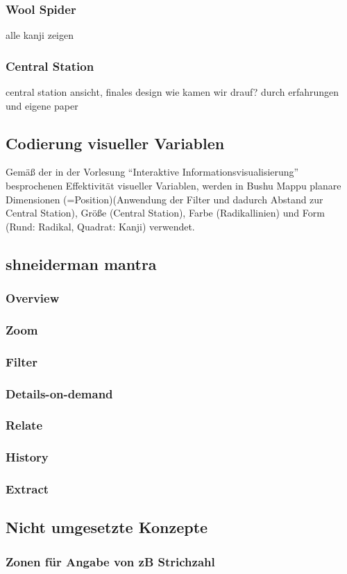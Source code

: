 \subsubsection{Wool Spider}
alle kanji zeigen

\subsubsection{Central Station}
central station ansicht, finales design
wie kamen wir drauf? durch erfahrungen und eigene paper

\subsection{Codierung visueller Variablen}
Gemäß der in der Vorlesung "`Interaktive Informationsvisualisierung"' besprochenen Effektivität visueller Variablen, werden in Bushu Mappu planare Dimensionen (=Position)(Anwendung der Filter und dadurch Abstand zur Central Station), Größe (Central Station), Farbe (Radikallinien) und Form (Rund: Radikal, Quadrat: Kanji) verwendet. 

\subsection{shneiderman mantra}
\subsubsection{Overview}
\subsubsection{Zoom}
\subsubsection{Filter}
\subsubsection{Details-on-demand}
\subsubsection{Relate}
\subsubsection{History}
\subsubsection{Extract}

\subsection{Nicht umgesetzte Konzepte}
\subsubsection{Zonen für Angabe von zB Strichzahl}